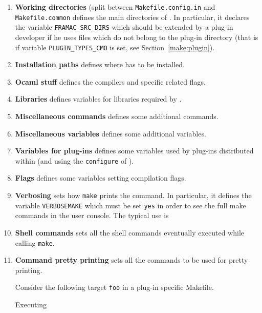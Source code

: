 \begin{enumerate}
\item \textbf{Working directories} (split between
  \texttt{Makefile.config.in} and \texttt{Makefile.common} defines the main
  directories of \framac. In particular, it declares the variable
  \texttt{FRAMAC\_SRC\_DIRS} which should be extended
  by a plug-in developer if he uses files which do not belong to the plug-in
  directory (that is if variable
  \texttt{PLUGIN\_TYPES\_CMO} is set, see
  Section~\ref{make:plugin}).
\item \textbf{Installation paths} defines where \framac has to be installed.
\item \textbf{Ocaml stuff} defines the \ocaml compilers and specific related
  flags.
\item \textbf{Libraries} defines variables for libraries required by \framac.
\item \textbf{Miscellaneous commands} defines some additional commands.
\item \textbf{Miscellaneous variables} defines some additional variables.
\item \textbf{Variables for plug-ins} defines some variables used by plug-ins
  distributed within \framac (and using the \texttt{configure} of \framac).
\item \textbf{Flags} defines some variables setting compilation flags.
\item \textbf{Verbosing} sets how \texttt{make} prints the command. In
  particular, it defines the variable \texttt{VERBOSEMAKE}
  which must be set \texttt{yes} in order to see the full make commands in the
  user console. The typical use is
\item \textbf{Shell commands} sets all the shell commands eventually executed
  while calling \texttt{make}.
\item \textbf{Command pretty printing} sets all the commands to be used for
  pretty printing.
\begin{example}
Consider the following target \texttt{foo} in a plug-in specific Makefile.
Executing

\end{example}
\end{enumerate}
